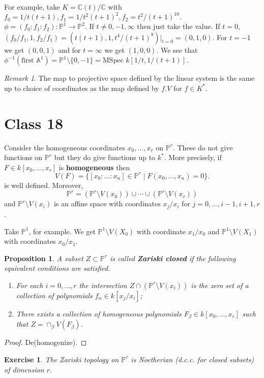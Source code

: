 \documentclass{article}
\newcommand{\C}{\mathbb{C}}
\newcommand{\Proj}{\mathbb{P}}
\theoremstyle{plain}
\newtheorem{prop}[thm]{Proposition}
\newtheorem{exc}{Exercise}
\theoremstyle{definition}
\theoremstyle{remark}
\newtheorem*{rem}{Remark}
\begin{document}
For example, take $K=\C(t)/\C$ with $f_0=1/t(t+1), f_1=1/t^2(t+1)^2,f_2=t^2/(t+1)^{10}.$ $\phi=(f_0:f_1:f_2):\Proj^1\to\Proj^2$. If $t\neq 0,-1,\infty$ then just take the value. If $t=0$, $(f_0/f_1,1,f_2/f_1)=(t(t+1),1,t^4/(t+1)^8)|_{t=0}=(0,1,0)$. For $t=-1$ we get $(0,0,1)$ and for $t=\infty$
 we get $(1,0,0)$. We see that $\phi^{-1}(\text{first }\mathbb{A}^1)=\Proj^1\setminus\{0,-1\}=\text{MSpec } k[1/t,1/(t+1)]$.
 
 \begin{rem}
 The map to projective space defined by the linear system is the same up to choice of coordinates as the map defined by $f.V$ for $f\in K^*$.
 \end{rem}


\section*{Class 18}

Consider the homogeneous coordinates $x_0,\ldots, x_r$ on $\Proj^r$. These do not give functions on $\Proj^r$ but they do give functions up to $k^*$. More precisely, if $F\in k[x_0,\ldots,x_r]$ is \textbf{homogeneous} then
\[V(F)=\{[x_0:\ldots:x_n]\in\Proj^r \mid F(x_0,\ldots,x_n)=0\}.\]
is well defined. Moreover,
\[\Proj^r=(\Proj^r\setminus V(x_0))\cup \cdots\cup (\Proj^r\setminus V(x_r))\]
and $\Proj^r\setminus V(x_i)$ is an affine space with coordinates $x_j/x_i$ for $j=0,\ldots, i-1,i+1,r$. 

Take $\Proj^1$, for example. We get $\Proj^1\setminus V(X_0)$ with coordinate $x_1/x_0$ and $\Proj^1\setminus V(X_1)$ with coordinates $x_0/x_1$.

\begin{prop}
\label{L103}
A subset $Z\subset\Proj^r$ is called \textbf{Zariski closed} if the following equivalent conditions are satisfied.
\begin{enumerate}
\item For each $i=0,\ldots,r$ the intersection $Z\cap(\Proj^r\setminus V(x_i))$ is the zero set of a collection of polynomials $f_\alpha\in k[x_j/x_i]$;
\item There exists a collection of homogeneous polynomials $F_\beta\in k[x_0,\ldots,x_r]$ such that $Z=\cap_\beta V(F_\beta)$.
\end{enumerate}
\end{prop}
\begin{proof}
De(homogenize).
\end{proof}

\begin{exc}
The Zariski topology on $\Proj^r$ is Noetherian (d.c.c. for closed subsets) of dimension $r$.
\end{exc}
\end{document}

